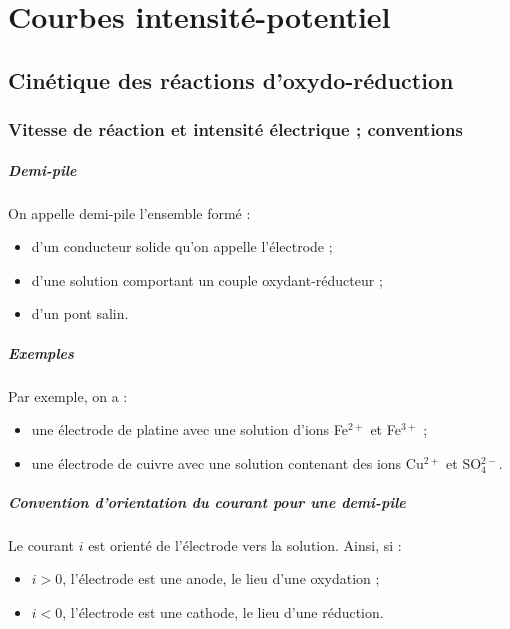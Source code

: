 \documentclass[french]{book}
\theoremstyle{plain}
\theoremstyle{definition}
\theoremstyle{remark}
\begin{document}
\chapter{Courbes intensité-potentiel}
\localtableofcontents
\section{Cinétique des réactions d'oxydo-réduction}
\subsection{Vitesse de réaction et intensité électrique ; conventions}

\paragraph{Demi-pile} On appelle demi-pile l'ensemble formé :
\begin{itemize}
	\item d'un conducteur solide qu'on appelle l'électrode ;
	\item d'une solution comportant un couple oxydant-réducteur ;
	\item d'un pont salin.
\end{itemize}

\paragraph{Exemples} Par exemple, on a :
\begin{itemize}
	\item une électrode de platine avec une solution d'ions Fe$^{2+}$ et Fe$^{3+}$ ;
	\item une électrode de cuivre avec une solution contenant des ions Cu$^{2+}$ et SO$_4^{2-}$.
\end{itemize}

\paragraph{Convention d'orientation du courant pour une demi-pile} Le courant $i$ est orienté de l'électrode vers la solution. Ainsi, si : \begin{itemize}
	\item $i>0$, l'électrode est une anode, le lieu d'une oxydation ;
	\item $i<0$, l'électrode est une cathode, le lieu d'une réduction.
\end{itemize}
\end{document}
